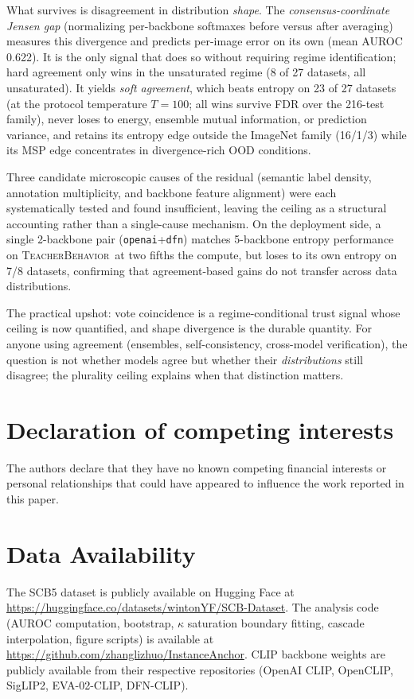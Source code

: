 \documentclass[a4paper,fleqn]{cas-sc}
\newcommand{\tb}{\textsc{TeacherBehavior}}
\begin{document}
What survives is disagreement in distribution \emph{shape}.
The \emph{consensus-coordinate Jensen gap} (normalizing per-backbone softmaxes before versus after averaging) measures this divergence and predicts per-image error on its own (mean AUROC 0.622). It is the only signal that does so without requiring regime identification; hard agreement only wins in the unsaturated regime (8 of 27 datasets, all unsaturated).
It yields \emph{soft agreement}, which beats entropy on 23 of 27 datasets (at the protocol temperature $T{=}100$; all wins survive FDR over the 216-test family), never loses to energy, ensemble mutual information, or prediction variance, and retains its entropy edge outside the ImageNet family (16/1/3) while its MSP edge concentrates in divergence-rich OOD conditions.

Three candidate microscopic causes of the residual (semantic label density, annotation multiplicity, and backbone feature alignment) were each systematically tested and found insufficient, leaving the ceiling as a structural accounting rather than a single-cause mechanism.
On the deployment side, a single 2-backbone pair (\texttt{openai}+\texttt{dfn}) matches 5-backbone entropy performance on \tb\ at two fifths the compute, but loses to its own entropy on 7/8 datasets, confirming that agreement-based gains do not transfer across data distributions.

The practical upshot: vote coincidence is a regime-conditional trust signal whose ceiling is now quantified, and shape divergence is the durable quantity.
For anyone using agreement (ensembles, self-consistency, cross-model verification), the question is not whether models agree but whether their \emph{distributions} still disagree; the plurality ceiling explains when that distinction matters.

\clearpage

\section*{Declaration of competing interests}
The authors declare that they have no known competing financial interests or personal relationships that could have appeared to influence the work reported in this paper.

\section*{Data Availability}
{\sloppy The SCB5 dataset is publicly available on Hugging Face at \url{https://huggingface.co/datasets/wintonYF/SCB-Dataset}. The analysis code (AUROC computation, bootstrap, $\kappa$ saturation boundary fitting, cascade interpolation, figure scripts) is available at \url{https://github.com/zhanglizhuo/InstanceAnchor}. CLIP backbone weights are publicly available from their respective repositories (OpenAI CLIP, OpenCLIP, SigLIP2, EVA-02-CLIP, DFN-CLIP).}
\end{document}
